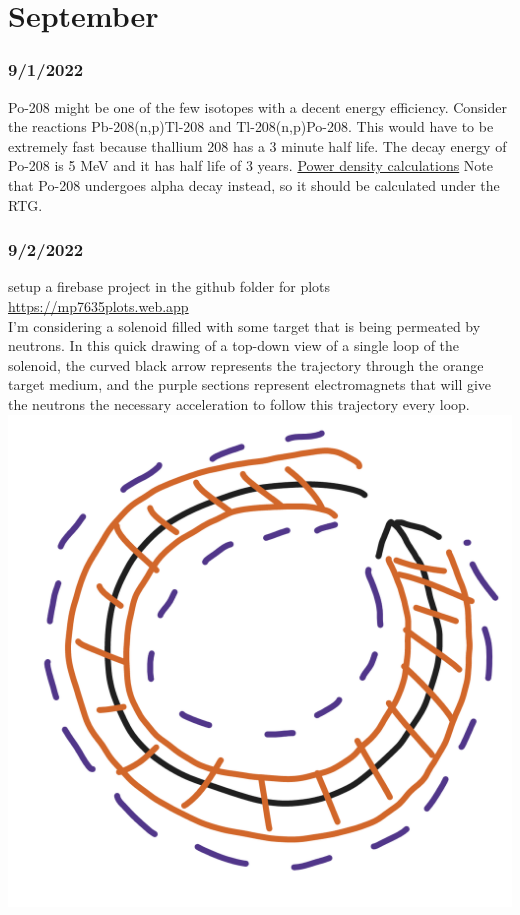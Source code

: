 \documentclass[12pt]{article}
\begin{document}
\section{September}
\subsubsection{9/1/2022}
Po-208 might be one of the few isotopes with a decent energy efficiency. Consider the reactions 
Pb-208(n,p)Tl-208 and Tl-208(n,p)Po-208. This would have to be extremely fast because thallium 208 has a 3 minute half life. The decay energy of Po-208 is 5 MeV and it has half life of 3 years. \href{https://github.com/MarcosP7635/Energy/blob/main/Power_density_po_208.ipynb}{Power density calculations} Note that Po-208 undergoes alpha decay instead, so it should be calculated under the RTG.
\subsubsection{9/2/2022}
setup a firebase project in the github folder for plots \href{https://mp7635plots.web.app}{https://mp7635plots.web.app}\\
I'm considering a solenoid filled with some target that is being permeated by neutrons. In this quick drawing of a top-down view of a single loop of the solenoid, the curved black arrow represents the trajectory through the
orange target medium, and the purple sections represent electromagnets that will give the neutrons the necessary acceleration to follow this trajectory every loop. \\
\includegraphics[]{Images/single_loop_top_down.PNG}\\
\end{document}
